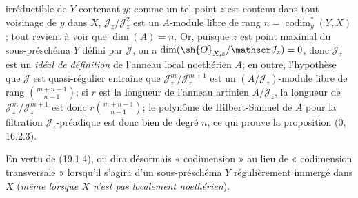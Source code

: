 
irréductible de $Y$ contenant $y$; comme un tel point $z$ est contenu dans tout voisinage de $y$ dans $X$, $\mathscr J_z/\mathscr J_z^2$ est un $A$-module libre de rang $n=\operatorname{codim}_y^*(Y,X)$; tout revient à voir que $\dim(A)=n$. Or, puisque $z$ est point maximal du sous-préschéma $Y$ défini par $\mathscr J$, on a $\dim(\sh{O}_{X,z}/\mathscr J_z)=0$, donc $\mathscr J_z$ est un \emph{idéal de définition} de l'anneau local noethérien $A$; en outre, l'hypothèse que $\mathscr J$ est quasi-régulier entraîne que $\mathscr J_z^m/\mathscr J_z^{m+1}$ est un $(A/\mathscr J_z)$-module libre de rang $\binom{m+n-1}{n-1}$; si $r$ est la longueur de l'anneau artinien $A/\mathscr J_z$, la longueur de $\mathscr J_z^m/\mathscr J_z^{m+1}$ est donc $r\binom{m+n-1}{n-1}$; le polynôme de Hilbert-Samuel de $A$ pour la filtration $\mathscr J_z$-préadique est donc bien de degré $n$, ce qui prouve la proposition ($0$, 16.2.3).

En vertu de (19.1.4), on dira désormais « codimension » au lieu de « codimension transversale » lorsqu'il s'agira d'un sous-préschéma $Y$ régulièrement immergé dans $X$ (\emph{même lorsque $X$ n'est pas localement noethérien}).

